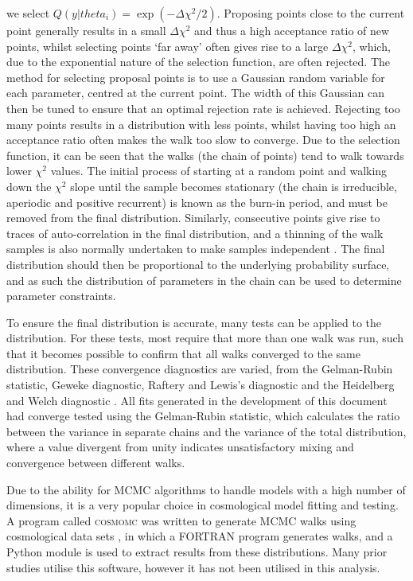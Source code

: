 \documentclass[titlesmallcaps, examinerscopy, copyrightpage]{uqthesis}
\begin{document}
we select $Q(y|theta_i) = \exp(-\Delta \chi^2 / 2)$. Proposing points close to the current point generally results in a small $\Delta \chi^2$ and thus a high acceptance ratio of new points, whilst selecting points `far away' often gives rise to a large $\Delta \chi^2$, which, due to the exponential nature of the selection function, are often rejected. The method for selecting proposal points is to use a Gaussian random variable for each parameter, centred at the current point. The width of this Gaussian can then be tuned to ensure that an optimal rejection rate is achieved. Rejecting too many points results in a distribution with less points, whilst having too high an acceptance ratio often makes the walk too slow to converge. Due to the selection function, it can be seen that the walks (the chain of points) tend to walk towards lower $\chi^2$ values. The initial process of starting at a random point and walking down the $\chi^2$ slope until the sample becomes stationary (the chain is irreducible, aperiodic and positive recurrent) is known as the burn-in period, and must be removed from the final distribution. Similarly, consecutive points give rise to traces of auto-correlation in the final distribution, and a thinning of the walk samples is also normally undertaken to make samples independent \citep{Gilks1995markov}. The final distribution should then be proportional to the underlying probability surface, and as such the distribution of parameters in the chain can be used to determine parameter constraints.

To ensure the final distribution is accurate, many tests can be applied to the distribution. For these tests, most require that more than one walk was run, such that it becomes possible to confirm that all walks converged to the same distribution. These convergence diagnostics are varied, from the Gelman-Rubin statistic, Geweke diagnostic, Raftery and Lewis's diagnostic and the Heidelberg and Welch diagnostic \citep{CowlesCarlin1996,Gilks1995markov}. All fits generated in the development of this document had converge tested using the Gelman-Rubin statistic, which calculates the ratio between the variance in separate chains and the variance of the total distribution, where a value divergent from unity indicates unsatisfactory mixing and convergence between different walks.

Due to the ability for MCMC algorithms to handle models with a high number of dimensions, it is a very popular choice in cosmological model fitting and testing. A program called \textsc{cosmomc} was written to generate MCMC walks using cosmological data sets \citep{LewisBridle2002}, in which a FORTRAN program generates walks, and a Python module is used to extract results from these distributions. Many prior studies utilise this software, however it has not been utilised in this analysis.
\end{document}
